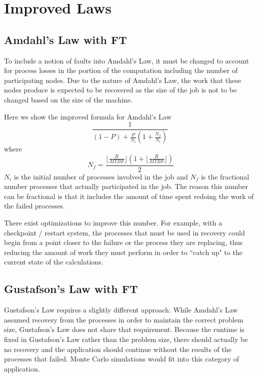 \documentclass[]{article}
\begin{document}
\section{Improved Laws}
\label{sect:improved}

\subsection{Amdahl's Law with FT}
\label{subsect:amdahl_improved}

To include a notion of faults into Amdahl's Law, it must be changed to account for process losses in the portion of the computation including the number of participating nodes. Due to the nature of Amdahl's Law, the work that these nodes produce is expected to be recovered as the size of the job is not to be changed based on the size of the machine.

Here we show the improved formula for Amdahl's Law$$\frac{1}{(1-P) + \frac{P}{N_i} (1+\frac{N_f}{N_i})}$$ where $$\ N_f = \frac{\lfloor\frac{R}{MTBF}\rfloor (1 + \lfloor\frac{R}{MTBF}\rfloor)}{2}$$ $N_i$ is the initial number of processes involved in the job and $N_f$ is the fractional number processes that actually participated in the job. The reason this number can be fractional is that it includes the amount of time spent redoing the work of the failed processes.

There exist optimizations to improve this number. For example, with a checkpoint / restart system, the processes that must be used in recovery could begin from a point closer to the failure or the process they are replacing, thus reducing the amount of work they must perform in order to ``catch up" to the current state of the calculations.

\subsection{Gustafson's Law with FT}
\label{subsect:gustafson_improved}

Gustafson's Law requires a slightly different approach. While Amdahl's Law assumed recovery from the processes in order to maintain the correct problem size, Gustafson's Law does not share that requirement. Because the runtime is fixed in Gustafson's Law rather than the problem size, there should actually be no recovery and the application should continue without the results of the processes that failed. Monte Carlo simulations would fit into this category of application.
\end{document}
